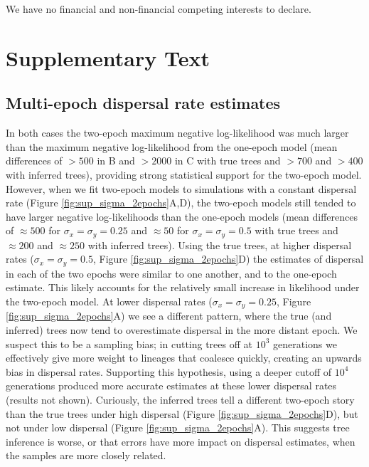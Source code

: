 \documentclass[12pt]{article}
\begin{document}
We have no financial and non-financial competing interests to declare.



\newpage
\section*{Supplementary Text}
\label{sec:appendix}

\subsection*{Multi-epoch dispersal rate estimates}

In both cases the two-epoch maximum negative log-likelihood was much larger than the maximum negative log-likelihood from the one-epoch model (mean differences of $>500$ in B and $>2000$ in C with true trees and $>700$ and $>400$ with inferred trees), providing strong statistical support for the two-epoch model.
However, when we fit two-epoch models to simulations with a constant dispersal rate (Figure \ref{fig:sup_sigma_2epochs}A,D), the two-epoch models still tended to have larger negative log-likelihoods than the one-epoch models (mean differences of $\approx500$ for $\sigma_x=\sigma_y=0.25$ and $\approx50$ for $\sigma_x=\sigma_y=0.5$ with true trees and $\approx200$ and $\approx250$ with inferred trees).
Using the true trees, at higher dispersal rates ($\sigma_x=\sigma_y=0.5$, Figure \ref{fig:sup_sigma_2epochs}D) the estimates of dispersal in each of the two epochs were similar to one another, and to the one-epoch estimate.
This likely accounts for the relatively small increase in likelihood under the two-epoch model.
At lower dispersal rates ($\sigma_x=\sigma_y=0.25$, Figure \ref{fig:sup_sigma_2epochs}A) we see a different pattern, where the true (and inferred) trees now tend to overestimate dispersal in the more distant epoch. 
We suspect this to be a sampling bias; in cutting trees off at $10^3$ generations we effectively give more weight to lineages that coalesce quickly, creating an upwards bias in dispersal rates.
Supporting this hypothesis, using a deeper cutoff of $10^4$ generations produced more accurate estimates at these lower dispersal rates (results not shown).
Curiously, the inferred trees tell a different two-epoch story than the true trees under high dispersal (Figure \ref{fig:sup_sigma_2epochs}D), but not under low dispersal (Figure \ref{fig:sup_sigma_2epochs}A). 
This suggests tree inference is worse, or that errors have more impact on dispersal estimates, when the samples are more closely related. 
\end{document}
